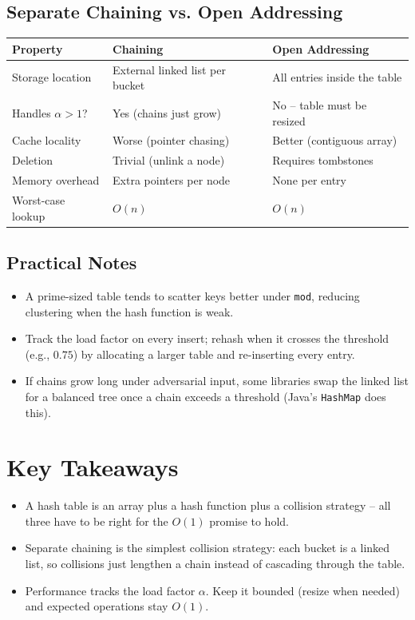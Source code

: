 \documentclass[11pt]{article}
\begin{document}
\subsection*{Separate Chaining vs. Open Addressing}
\begin{center}
\begin{tabular}{l|l|l}
\textbf{Property} & \textbf{Chaining} & \textbf{Open Addressing} \\ \hline
Storage location    & External linked list per bucket & All entries inside the table  \\
Handles $\alpha > 1$? & Yes (chains just grow)        & No -- table must be resized    \\
Cache locality      & Worse (pointer chasing)         & Better (contiguous array)     \\
Deletion            & Trivial (unlink a node)         & Requires tombstones           \\
Memory overhead     & Extra pointers per node         & None per entry                \\
Worst-case lookup   & $O(n)$                          & $O(n)$                        \\
\end{tabular}
\end{center}

\subsection*{Practical Notes}
\begin{itemize}[leftmargin=*]
    \item A prime-sized table tends to scatter keys better under
          \texttt{mod}, reducing clustering when the hash function is
          weak.
    \item Track the load factor on every insert; rehash when it crosses
          the threshold (e.g., $0.75$) by allocating a larger table and
          re-inserting every entry.
    \item If chains grow long under adversarial input, some libraries
          swap the linked list for a balanced tree once a chain exceeds
          a threshold (Java's \texttt{HashMap} does this).
\end{itemize}

\section*{Key Takeaways}
\begin{itemize}[leftmargin=*]
    \item A hash table is an array plus a hash function plus a collision
          strategy -- all three have to be right for the $O(1)$ promise
          to hold.
    \item Separate chaining is the simplest collision strategy: each
          bucket is a linked list, so collisions just lengthen a chain
          instead of cascading through the table.
    \item Performance tracks the load factor $\alpha$. Keep it bounded
          (resize when needed) and expected operations stay $O(1)$.
\end{itemize}
\end{document}
